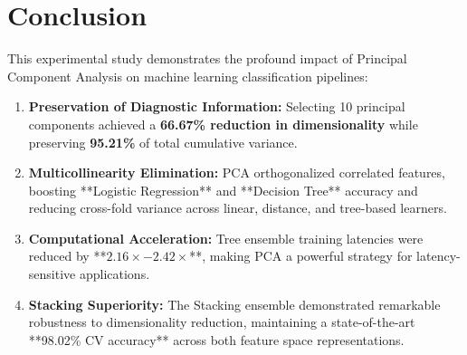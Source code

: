 \documentclass[12pt,a4paper]{article}
\begin{document}
\section{Conclusion}
This experimental study demonstrates the profound impact of Principal Component Analysis on machine learning classification pipelines:
\begin{enumerate}
\item \textbf{Preservation of Diagnostic Information:} Selecting 10 principal components achieved a \textbf{66.67\% reduction in dimensionality} while preserving \textbf{95.21\%} of total cumulative variance.
\item \textbf{Multicollinearity Elimination:} PCA orthogonalized correlated features, boosting **Logistic Regression** and **Decision Tree** accuracy and reducing cross-fold variance across linear, distance, and tree-based learners.
\item \textbf{Computational Acceleration:} Tree ensemble training latencies were reduced by **$2.16\times - 2.42\times$**, making PCA a powerful strategy for latency-sensitive applications.
\item \textbf{Stacking Superiority:} The Stacking ensemble demonstrated remarkable robustness to dimensionality reduction, maintaining a state-of-the-art **98.02\% CV accuracy** across both feature space representations.
\end{enumerate}
\end{document}
